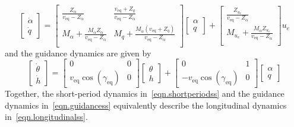 \documentclass[]{../sty/aiaa-tc}
\theoremstyle{examplestyle}
\begin{document}
  \begin{equation}
    \label{eqn.shortperiodss}
    \begin{bmatrix}
      \dot{\alpha} \\
      \dot{q}
    \end{bmatrix}=
    \begin{bmatrix}
      \frac{Z_{\alpha}}{v_{\text{eq}}-Z_{\dot{\alpha}}} & \frac{v_{\text{eq}}+Z_{q}}{v_{\text{eq}}-Z_{\dot{\alpha}}} \\
      M_{\alpha}+\frac{M_{\dot{\alpha}}Z_{\alpha}}{v_{\text{eq}}-Z_{\dot{\alpha}}} & M_{q}+\frac{M_{\dot{\alpha}}(v_{\text{eq}}+Z_{q})}{v_{\text{eq}}-Z_{\dot{\alpha}}} \\
    \end{bmatrix}
    \begin{bmatrix}
      \alpha \\
      q
    \end{bmatrix}+
    \begin{bmatrix}
      \frac{Z_{u_{e}}}{v_{\text{eq}}-Z_{\dot{\alpha}}} \\
      M_{u_{e}}+\frac{M_{\dot{\alpha}}Z_{u_{e}}}{v_{\text{eq}}-Z_{\dot{\alpha}}} \\
    \end{bmatrix}
    u_{e}
  \end{equation}
  and the guidance dynamics are given by
  \begin{equation}
    \label{eqn.guidancess}
    \begin{bmatrix}
      \dot{\theta} \\
      \dot{h}
    \end{bmatrix}=
    \begin{bmatrix}
      0 & 0 \\
      v_{\text{eq}}\cos(\gamma_{\text{eq}}) & 0
    \end{bmatrix}
    \begin{bmatrix}
      \theta \\
      h
    \end{bmatrix}
    +
    \begin{bmatrix}
      0 & 1 \\
      -v_{\text{eq}}\cos(\gamma_{\text{eq}}) & 0
    \end{bmatrix}
    \begin{bmatrix}
      \alpha \\
      q
    \end{bmatrix}
  \end{equation}
  Together, the short-period dynamics in\ \eqref{eqn.shortperiodss} and the guidance dynamics in\ \eqref{eqn.guidancess} equivalently describe the longitudinal dynamics in\ \eqref{eqn.longitudinalss}.
\end{document}
